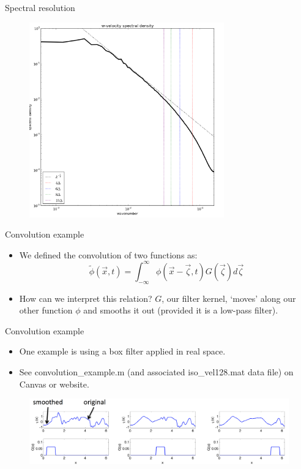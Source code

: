 \begin{frame}{Spectral resolution}
\begin{figure}
	\includegraphics[width=0.75\textwidth]{wspectra.png}
\end{figure}
\end{frame}



\begin{frame}{Convolution example}
\begin{itemize}
	\item We defined the convolution of two functions as:
	$$\tilde \phi (\vec{x},t) = \int_{-\infty}^{\infty} \phi (\vec{x} - \vec{\zeta},t) G(\vec{\zeta}) d \vec{\zeta}$$
	\item How can we interpret this relation? $G$, our filter kernel, `moves' along our other function $\phi$ and smooths it out (provided it is a low-pass filter).
\end{itemize}
\end{frame}

\begin{frame}{Convolution example}
\begin{itemize}
	\item One example is using a box filter applied in real space.
	\item See convolution\_example.m (and associated iso\_vel128.mat data file) on Canvas or website.
\end{itemize}
\begin{figure}
	\includegraphics[width=1\textwidth]{convolution.png}
\end{figure}
\end{frame}

